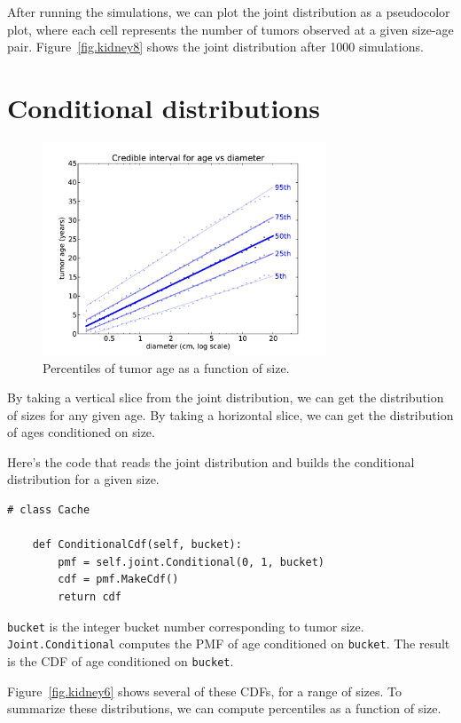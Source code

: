 \documentclass[12pt]{book}
\begin{document}
After running the simulations, we can plot the joint distribution
as a pseudocolor plot, where each cell represents the number of
tumors observed at a given size-age pair.
Figure~\ref{fig.kidney8} shows the joint distribution after 1000
simulations.



\section{Conditional distributions}

\begin{figure}
\centerline{\includegraphics[height=2.5in]{figs/kidney7.pdf}}
\caption{Percentiles of tumor age as a function of size.}
\label{fig.kidney7}
\end{figure}

By taking a vertical slice from the joint distribution, we can get the
distribution of sizes for any given age.  By taking a horizontal
slice, we can get the distribution of ages conditioned on size.

Here's the code that reads the joint distribution and builds
the conditional distribution for a given size.

\begin{verbatim}
# class Cache

    def ConditionalCdf(self, bucket):
        pmf = self.joint.Conditional(0, 1, bucket)
        cdf = pmf.MakeCdf()
        return cdf
\end{verbatim}

\verb"bucket" is the integer bucket number corresponding to
tumor size.  {\tt Joint.Conditional} computes the
PMF of age conditioned on {\tt bucket}.
The result is the CDF of age conditioned on {\tt bucket}.

Figure~\ref{fig.kidney6} shows several of these CDFs, for
a range of sizes.  To summarize these distributions, we can
compute percentiles as a function of size.
\end{document}
